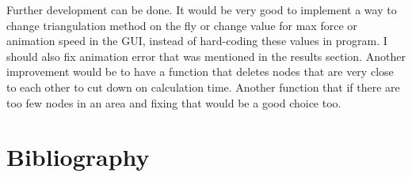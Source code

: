 \documentclass[a4,10pt]{article}
\begin{document}
Further development can be done. It would be very good to implement a way to change triangulation method on the fly or change value for max force or animation speed in the GUI, instead of hard-coding these values in program. I should also fix animation error that was mentioned in the results section. Another improvement would be to have a function that deletes nodes that are very close to each other to cut down on calculation time. Another function that if there are too few nodes in an area and fixing that would be a good choice too.

\section{Bibliography}
\begingroup
  \def\section*#1{}
  
  
\endgroup
\end{document}
